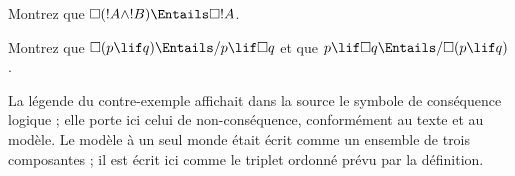 \documentclass[../../../include/open-logic-section]{subfiles}
\begin{document}
\begin{prob}
  Montrez que $\Box (!A \land !B) \Entails \Box !A$.
\end{prob}

\begin{prob}
  Montrez que $\Box (p \lif q) \Entails/ p \lif \Box q$ et que
  $p \lif \Box q \Entails/\Box (p \lif q)$.
\end{prob}
\begin{editorial}La légende du contre-exemple affichait dans la source le symbole de conséquence logique ; elle porte ici celui de non-conséquence, conformément au texte et au modèle. Le modèle à un seul monde était écrit comme un ensemble de trois composantes ; il est écrit ici comme le triplet ordonné prévu par la définition.\end{editorial}
\end{document}
